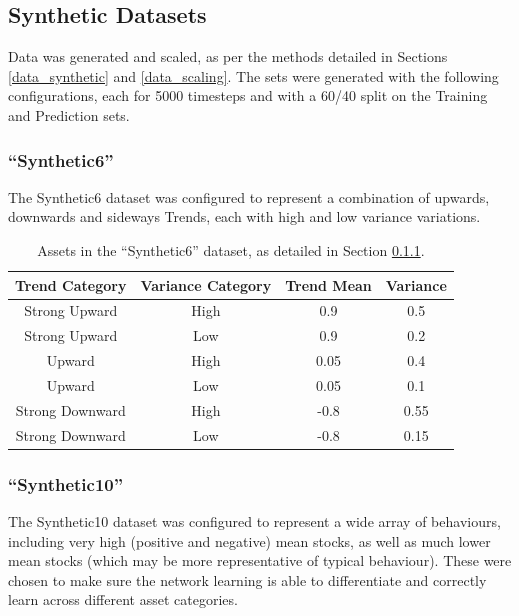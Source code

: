 \documentclass[a4paper,11pt,oneside]{article}
\theoremstyle{plain}
\theoremstyle{definition}
\begin{document}
	
	
	\subsection{Synthetic Datasets}
	
	Data was generated and scaled, as per the methods detailed in Sections \ref{data_synthetic} and \ref{data_scaling}. The sets were generated with the following configurations, each for 5000 timesteps and with a 60/40 split on the Training and Prediction sets.
	
	\subsubsection{``Synthetic6''} \label{dataset_synthetic6}
	
	The Synthetic6 dataset was configured to represent a combination of upwards, downwards and sideways Trends, each with high and low variance variations.
	
	\begin{table}[h]
		\centering
		\small
		\begin{tabular}{|c|c|c|c|}
			\hline
			\textbf{Trend Category} &\textbf{Variance Category} & \textbf{Trend Mean} & \textbf{Variance}\\\hline	
			{Strong Upward} & {High} & {0.9} & {0.5} \\\hline
			{Strong Upward} & {Low} & {0.9} & {0.2} \\\hline
			{Upward} & {High} & {0.05} & {0.4} \\\hline
			{Upward} & {Low} & {0.05} & {0.1} \\\hline
			{Strong Downward} & {High} & {-0.8} & {0.55} \\\hline
			{Strong Downward} & {Low} & {-0.8} & {0.15} \\\hline
		\end{tabular}
		\newline\newline
		\caption{Assets in the ``Synthetic6'' dataset, as detailed in Section \ref{dataset_synthetic6}.}\label{tab_synth6}
	\end{table}
	
	\subsubsection{``Synthetic10''}\label{dataset_synthetic10}
	
	The Synthetic10 dataset was configured to represent a wide array of behaviours, including very high (positive and negative) mean stocks, as well as much lower mean stocks (which may be more representative of typical behaviour). These were chosen to make sure the network learning is able to differentiate and correctly learn across different asset categories.
	
\end{document}
